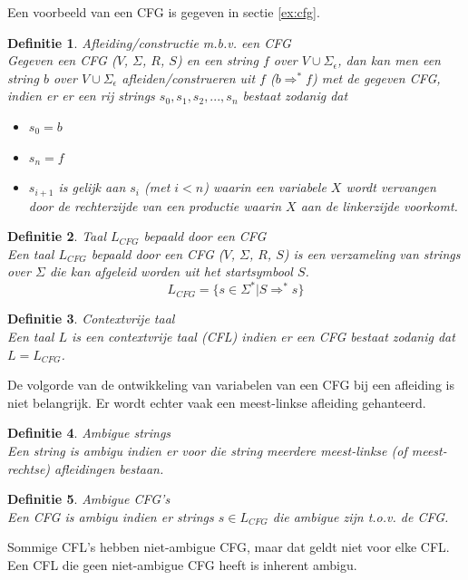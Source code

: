 \documentclass[a4paper]{article}
\newtheorem{tdefinitie}{Definitie}[section]
\newenvironment{definitie}[1]%
  {\begin{mdframed}[backgroundcolor=silver,
    topline=false,
    rightline=false,
    leftline=false,
    bottomline=false]\begin{tdefinitie}#1\\\normalfont}%
  {\end{tdefinitie}\end{mdframed}}
\newcommand{\sstar}{\ensuremath{\Sigma^*}}
\begin{document}
Een voorbeeld van een CFG is gegeven in sectie \ref{ex:cfg}.

\begin{definitie}{Afleiding/constructie m.b.v. een CFG}
  Gegeven een CFG ($V$, $\Sigma$, $R$, $S$) en een string $f$ over $V \cup \Sigma_\epsilon$, dan kan men een string $b$ over $V \cup \Sigma_\epsilon$ afleiden/construeren uit $f$ ($b \Rightarrow^* f$) met de gegeven CFG, indien er er een rij strings $s_0,s_1,s_2,...,s_n$ bestaat zodanig dat
  \begin{itemize}
  \item $s_0 = b$
  \item $s_n = f$
  \item $s_{i+1}$ is gelijk aan $s_i$ (met $i < n$) waarin een variabele $X$ wordt vervangen door de rechterzijde van een productie waarin $X$ aan de linkerzijde voorkomt.
  \end{itemize}
\end{definitie}

\begin{definitie}{Taal $L_{CFG}$ bepaald door een CFG}
  Een taal $L_{CFG}$ bepaald door een CFG ($V$, $\Sigma$, $R$, $S$) is een verzameling van strings over $\Sigma$ die kan afgeleid worden uit het startsymbool $S$.
  \begin{equation*}
  L_{CFG} = \{s \in \sstar|S \Rightarrow^* s\}
  \end{equation*}
\end{definitie}

\begin{definitie}{Contextvrije taal}
  Een taal $L$ is een contextvrije taal (CFL) indien er een CFG bestaat zodanig dat $L = L_{CFG}$.
\end{definitie}

De volgorde van de ontwikkeling van variabelen van een CFG bij een afleiding is niet belangrijk. Er wordt echter vaak een meest-linkse afleiding gehanteerd.

\begin{definitie}{Ambigue strings}
  Een string is ambigu indien er voor die string meerdere meest-linkse (of meest-rechtse) afleidingen bestaan.
\end{definitie}

\begin{definitie}{Ambigue CFG's}
  Een CFG is ambigu indien er strings $s \in L_{CFG}$ die ambigue zijn t.o.v. de CFG.
\end{definitie}
Sommige CFL's hebben niet-ambigue CFG, maar dat geldt niet voor elke CFL. Een CFL die geen niet-ambigue CFG heeft is inherent ambigu.
\end{document}
